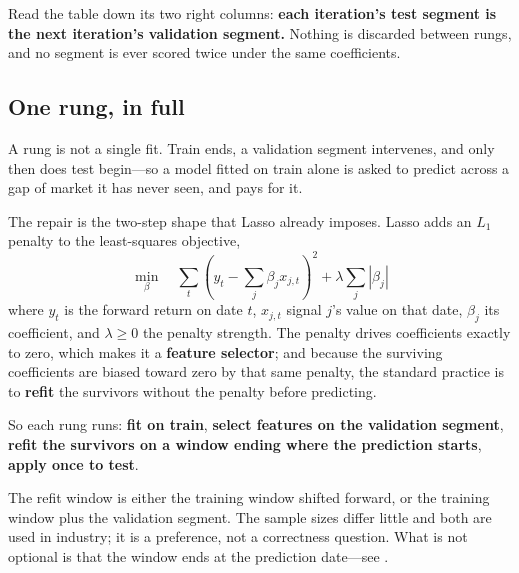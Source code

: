 \begin{note}
Read the table down its two right columns: \textbf{each iteration's test segment is the next
iteration's validation segment.} Nothing is discarded between rungs, and no segment is ever scored
twice under the same coefficients.
\end{note}

\subsection{One rung, in full}\label{sec:one-rung}

A rung is not a single fit. Train ends, a validation segment intervenes, and only then does test
begin---so a model fitted on train alone is asked to predict across a gap of market it has never
seen, and pays for it.

The repair is the two-step shape that Lasso already imposes. Lasso adds an $L_1$ penalty to the
least-squares objective,
\[
  \min_{\beta} \quad \sum_t \left( y_t - \sum_j \beta_j x_{j,t} \right)^{2}
    + \lambda \sum_j \left| \beta_j \right|
\]
where $y_t$ is the forward return on date $t$, $x_{j,t}$ signal $j$'s value on that date,
$\beta_j$ its coefficient, and $\lambda \geq 0$ the penalty strength. The penalty drives
coefficients exactly to zero, which makes it a \textbf{feature selector}; and because the
surviving coefficients are biased toward zero by that same penalty, the standard practice is to
\textbf{refit} the survivors without the penalty before predicting.


So each rung runs: \textbf{fit on train}, \textbf{select features on the validation segment},
\textbf{refit the survivors on a window ending where the prediction starts}, \textbf{apply once to
test}.

\begin{note}
The refit window is either the training window shifted forward, or the training window plus the
validation segment. The sample sizes differ little and both are used in industry; it is a
preference, not a correctness question. What is not optional is that the window ends at the
prediction date---see .
\end{note}

